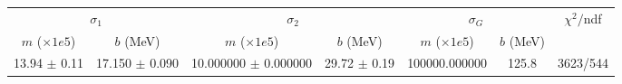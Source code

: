 \begin{tabular}{cc|cc|cc||c}
\multicolumn{2}{c|}{$\sigma_1$} & \multicolumn{2}{|c}{$\sigma_2$} & \multicolumn{2}{|c}{$\sigma_G$}  & \multirow{2}{*}{$\chi^2/$ndf}\\
$m$ ($\times1e5$) & $b$ (MeV) & $m$ ($\times1e5$) & $b$ (MeV) & $m$ ($\times1e5$) & $b$ (MeV) & \\
\hline
13.94 $\pm$ 0.11 & 17.150 $\pm$ 0.090 & 10.000000 $\pm$ 0.000000 & 29.72 $\pm$ 0.19 & 100000.000000 & 125.8 & 3623/544\\
\end{tabular}

